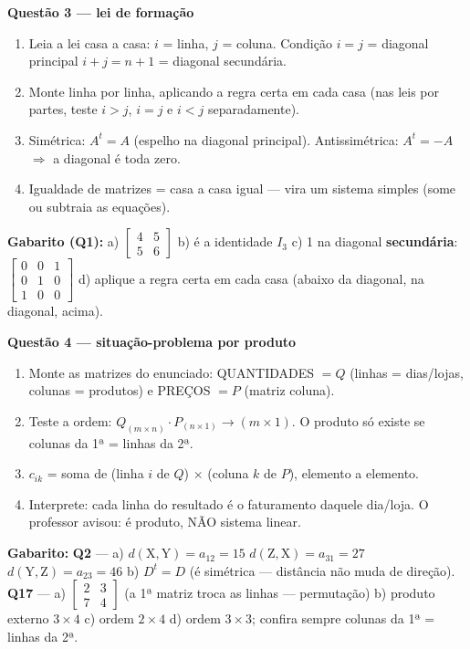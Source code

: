 \documentclass[11pt]{article}
\begin{document}
\begin{metodobox}
\textbf{\color{tealdeep}Questão 3 — lei de formação}
\begin{enumerate}[label=\arabic*., leftmargin=1.6em]
  \item Leia a lei casa a casa: $i$ = linha, $j$ = coluna. Condição $i=j$ = diagonal principal \quad $i+j=n+1$ = diagonal secundária.
  \item Monte linha por linha, aplicando a regra certa em cada casa (nas leis por partes, teste $i>j$, $i=j$ e $i<j$ separadamente).
  \item Simétrica: $A^{t}=A$ (espelho na diagonal principal). Antissimétrica: $A^{t}=-A$ $\Rightarrow$ a diagonal é toda zero.
  \item Igualdade de matrizes = casa a casa igual — vira um sistema simples (some ou subtraia as equações).
\end{enumerate}
\textbf{Gabarito (Q1):} a) $\begin{bmatrix} 4 & 5 \\ 5 & 6 \end{bmatrix}$ \; b) é a identidade $I_{3}$ \; c) 1 na diagonal \textbf{secundária}: $\begin{bmatrix} 0 & 0 & 1 \\ 0 & 1 & 0 \\ 1 & 0 & 0 \end{bmatrix}$ \; d) aplique a regra certa em cada casa (abaixo da diagonal, na diagonal, acima).
\end{metodobox}

\begin{metodobox}
\textbf{\color{tealdeep}Questão 4 — situação-problema por produto}
\begin{enumerate}[label=\arabic*., leftmargin=1.6em]
  \item Monte as matrizes do enunciado: QUANTIDADES $=Q$ (linhas = dias/lojas, colunas = produtos) e PREÇOS $=P$ (matriz coluna).
  \item Teste a ordem: $Q_{(m\times n)}\cdot P_{(n\times 1)} \to (m\times 1)$. O produto só existe se colunas da 1ª = linhas da 2ª.
  \item $c_{ik}$ = soma de (linha $i$ de $Q$) $\times$ (coluna $k$ de $P$), elemento a elemento.
  \item Interprete: cada linha do resultado é o faturamento daquele dia/loja. O professor avisou: é produto, NÃO sistema linear.
\end{enumerate}
\textbf{Gabarito:} \textbf{Q2} — a) $d(\text{X},\text{Y})=a_{12}=15$ \; $d(\text{Z},\text{X})=a_{31}=27$ \; $d(\text{Y},\text{Z})=a_{23}=46$ \; b) $D^{t}=D$ (é simétrica — distância não muda de direção). \quad \textbf{Q17} — a) $\begin{bmatrix} 2 & 3 \\ 7 & 4 \end{bmatrix}$ (a 1ª matriz troca as linhas — permutação) \; b) produto externo $3\times 4$ \; c) ordem $2\times 4$ \; d) ordem $3\times 3$; confira sempre colunas da 1ª = linhas da 2ª.
\end{metodobox}
\end{document}
